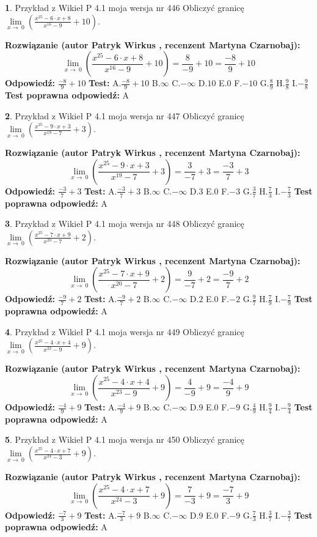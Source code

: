 \documentclass[12pt, a4paper]{article}
\theoremstyle{definition} %
\newtheorem{zad}{}
\newcommand{\zadStart}[1]{\begin{zad}#1\newline}
\newcommand{\zadStop}{\end{zad}}
\newcommand{\rozwStart}[2]{\noindent \textbf{Rozwiązanie (autor #1 , recenzent #2): }\newline}
\newcommand{\rozwStop}{\newline}
\newcommand{\odpStart}{\noindent \textbf{Odpowiedź:}\newline}
\newcommand{\odpStop}{\newline}
\newcommand{\testStart}{\noindent \textbf{Test:}\newline}
\newcommand{\testStop}{\newline}
\newcommand{\kluczStart}{\noindent \textbf{Test poprawna odpowiedź:}\newline}
\newcommand{\kluczStop}{\newline}
\begin{document}
\zadStart{Przykład z Wikieł P 4.1 moja wersja nr 446}
Obliczyć granicę $\lim\limits_{x\to\ 0}(\frac{x^{25}-6 \cdot x +8}{x^{16}-9}+10)$.
\zadStop
\rozwStart{Patryk Wirkus}{Martyna Czarnobaj}
$$\lim\limits_{x\to\ 0}(\frac{x^{25}-6 \cdot x +8}{x^{16}-9}+10)=\frac{8}{-9}+10=\frac{-8}{9}+10$$
\rozwStop
\odpStart
$\frac{-8}{9}+10$
\odpStop
\testStart
A.$\frac{-8}{9}+10$
B.$\infty$
C.$-\infty$
D.$10$
E.$0$
F.$-10$
G.$\frac{8}{9}$
H.$\frac{9}{8}$
I.$-\frac{9}{8}$
\testStop
\kluczStart
A
\kluczStop



\zadStart{Przykład z Wikieł P 4.1 moja wersja nr 447}
Obliczyć granicę $\lim\limits_{x\to\ 0}(\frac{x^{25}-9 \cdot x +3}{x^{19}-7}+3)$.
\zadStop
\rozwStart{Patryk Wirkus}{Martyna Czarnobaj}
$$\lim\limits_{x\to\ 0}(\frac{x^{25}-9 \cdot x +3}{x^{19}-7}+3)=\frac{3}{-7}+3=\frac{-3}{7}+3$$
\rozwStop
\odpStart
$\frac{-3}{7}+3$
\odpStop
\testStart
A.$\frac{-3}{7}+3$
B.$\infty$
C.$-\infty$
D.$3$
E.$0$
F.$-3$
G.$\frac{3}{7}$
H.$\frac{7}{3}$
I.$-\frac{7}{3}$
\testStop
\kluczStart
A
\kluczStop



\zadStart{Przykład z Wikieł P 4.1 moja wersja nr 448}
Obliczyć granicę $\lim\limits_{x\to\ 0}(\frac{x^{25}-7 \cdot x +9}{x^{20}-7}+2)$.
\zadStop
\rozwStart{Patryk Wirkus}{Martyna Czarnobaj}
$$\lim\limits_{x\to\ 0}(\frac{x^{25}-7 \cdot x +9}{x^{20}-7}+2)=\frac{9}{-7}+2=\frac{-9}{7}+2$$
\rozwStop
\odpStart
$\frac{-9}{7}+2$
\odpStop
\testStart
A.$\frac{-9}{7}+2$
B.$\infty$
C.$-\infty$
D.$2$
E.$0$
F.$-2$
G.$\frac{9}{7}$
H.$\frac{7}{9}$
I.$-\frac{7}{9}$
\testStop
\kluczStart
A
\kluczStop



\zadStart{Przykład z Wikieł P 4.1 moja wersja nr 449}
Obliczyć granicę $\lim\limits_{x\to\ 0}(\frac{x^{25}-4 \cdot x +4}{x^{23}-9}+9)$.
\zadStop
\rozwStart{Patryk Wirkus}{Martyna Czarnobaj}
$$\lim\limits_{x\to\ 0}(\frac{x^{25}-4 \cdot x +4}{x^{23}-9}+9)=\frac{4}{-9}+9=\frac{-4}{9}+9$$
\rozwStop
\odpStart
$\frac{-4}{9}+9$
\odpStop
\testStart
A.$\frac{-4}{9}+9$
B.$\infty$
C.$-\infty$
D.$9$
E.$0$
F.$-9$
G.$\frac{4}{9}$
H.$\frac{9}{4}$
I.$-\frac{9}{4}$
\testStop
\kluczStart
A
\kluczStop



\zadStart{Przykład z Wikieł P 4.1 moja wersja nr 450}
Obliczyć granicę $\lim\limits_{x\to\ 0}(\frac{x^{25}-4 \cdot x +7}{x^{24}-3}+9)$.
\zadStop
\rozwStart{Patryk Wirkus}{Martyna Czarnobaj}
$$\lim\limits_{x\to\ 0}(\frac{x^{25}-4 \cdot x +7}{x^{24}-3}+9)=\frac{7}{-3}+9=\frac{-7}{3}+9$$
\rozwStop
\odpStart
$\frac{-7}{3}+9$
\odpStop
\testStart
A.$\frac{-7}{3}+9$
B.$\infty$
C.$-\infty$
D.$9$
E.$0$
F.$-9$
G.$\frac{7}{3}$
H.$\frac{3}{7}$
I.$-\frac{3}{7}$
\testStop
\kluczStart
A
\kluczStop
\end{document}
